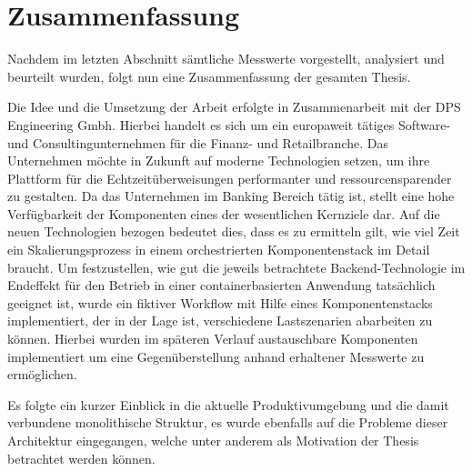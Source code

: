\chapter{Zusammenfassung}

Nachdem im letzten Abschnitt sämtliche Messwerte vorgestellt, analysiert und beurteilt wurden, folgt nun eine Zusammenfassung der gesamten Thesis.

Die Idee und die Umsetzung der Arbeit erfolgte in Zusammenarbeit mit der DPS Engineering
Gmbh. Hierbei handelt es sich um ein europaweit tätiges Software- und Consultingunternehmen für
die Finanz- und Retailbranche. Das Unternehmen möchte in Zukunft auf moderne Technologien setzen, um ihre Plattform für die Echtzeitüberweisungen performanter und ressourcensparender zu gestalten. Da das Unternehmen im Banking Bereich tätig ist, stellt eine hohe Verfügbarkeit der Komponenten
eines der wesentlichen Kernziele dar. Auf die neuen Technologien bezogen bedeutet dies, dass es zu
ermitteln gilt, wie viel Zeit ein Skalierungsprozess in einem orchestrierten Komponentenstack im
Detail braucht. Um festzustellen, wie gut die jeweils betrachtete Backend-Technologie im Endeffekt für den Betrieb in einer containerbasierten Anwendung tatsächlich geeignet ist, wurde ein fiktiver Workflow mit Hilfe eines Komponentenstacks implementiert, der in der Lage ist, verschiedene Lastszenarien abarbeiten zu können. Hierbei wurden im späteren Verlauf austauschbare Komponenten implementiert um eine Gegenüberstellung anhand erhaltener Messwerte zu ermöglichen.

Es folgte ein kurzer Einblick in die aktuelle Produktivumgebung und die damit verbundene monolithische Struktur, es wurde ebenfalls auf die Probleme dieser Architektur eingegangen, welche unter anderem als Motivation der Thesis betrachtet werden können.

